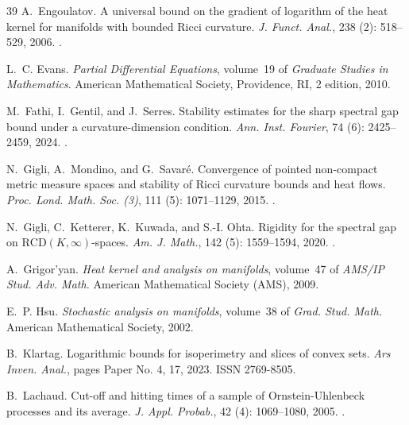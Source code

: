 \documentclass[10pt,reqno]{amsart}
\numberwithin{equation}{section}
\begin{document}
\begin{thebibliography}{39}
A.~Engoulatov.
\newblock A universal bound on the gradient of logarithm of the heat kernel for
  manifolds with bounded {R}icci curvature.
\newblock \emph{J. Funct. Anal.}, 238 (2): 518--529, 2006.
\newblock {}.

L.~C. Evans.
\newblock \emph{Partial Differential Equations}, volume~19 of \emph{Graduate
  Studies in Mathematics}.
\newblock American Mathematical Society, Providence, RI, 2 edition, 2010.

M.~Fathi, I.~Gentil, and J.~Serres.
\newblock Stability estimates for the sharp spectral gap bound under a
  curvature-dimension condition.
\newblock \emph{Ann. Inst. Fourier}, 74 (6): 2425--2459,
  2024.
\newblock {}.

N.~Gigli, A.~Mondino, and G.~Savar{\'e}.
\newblock Convergence of pointed non-compact metric measure spaces and
  stability of {Ricci} curvature bounds and heat flows.
\newblock \emph{Proc. Lond. Math. Soc. (3)}, 111 (5):
  1071--1129, 2015.
\newblock {}.

N.~Gigli, C.~Ketterer, K.~Kuwada, and S.-I. Ohta.
\newblock Rigidity for the spectral gap on {{\(\mathrm{RCD}(K,
  \infty)\)}}-spaces.
\newblock \emph{Am. J. Math.}, 142 (5): 1559--1594, 2020.
\newblock {}.

A.~Grigor'yan.
\newblock \emph{Heat kernel and analysis on manifolds}, volume~47 of
  \emph{AMS/IP Stud. Adv. Math.}
\newblock American Mathematical Society (AMS), 2009.

E.~P. Hsu.
\newblock \emph{Stochastic analysis on manifolds}, volume~38 of \emph{Grad.
  Stud. Math.}
\newblock American Mathematical Society, 2002.

B.~Klartag.
\newblock Logarithmic bounds for isoperimetry and slices of convex sets.
\newblock \emph{Ars Inven. Anal.}, pages Paper No. 4, 17, 2023.
\newblock ISSN 2769-8505.

B.~Lachaud.
\newblock Cut-off and hitting times of a sample of {O}rnstein-{U}hlenbeck
  processes and its average.
\newblock \emph{J. Appl. Probab.}, 42 (4): 1069--1080, 2005.
\newblock {}.


\end{thebibliography}
\end{document}
